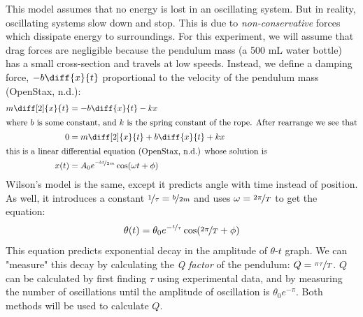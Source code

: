 \documentclass[notitlepage,twocolumn, 12pt]{report}
\begin{document}
    This model assumes that no energy is lost in an oscillating system. But in reality, oscillating systems slow down and stop. This is due to \textit{non-conservative} forces which dissipate energy to surroundings. For this experiment, we will assume that drag forces are negligible because the pendulum mass (a 500 mL water bottle) has a small cross-section and travels at low speeds. Instead, we define a damping force, $-b \diff{x}{t}$ proportional to the velocity of the pendulum mass (OpenStax, n.d.):
    \begin{align*}
        m \diff[2]{x}{t} &= - b \diff{x}{t} - kx \\
        \intertext{where $b$ is some constant, and $k$ is the spring constant of the rope. After rearrange we see that}
        0 &= m \diff[2]{x}{t} + b \diff{x}{t} + kx   \\
    \intertext{this is a linear differential equation (OpenStax, n.d.) whose solution is} 
        x(t) &= A_0e^{\nicefrac{-bt}{2m}}\cos(\omega t + \phi)
    \end{align*} 
    Wilson's model is the same, except it predicts angle with time instead of position. As well, it introduces a constant $\nicefrac{1}{\tau} = \nicefrac{b}{2m}$ and uses $\omega = \nicefrac{2 \pi}{T}$ to get the equation:
    \begin{equation}\label{eq:1}
        \theta(t) = \theta_0 e^{-\nicefrac{t}{\tau}}\cos(\nicefrac{2\pi}{T} + \phi)
    \end{equation}
    This equation predicts exponential decay in the amplitude of $\theta$-$t$ graph. We can "measure" this decay by calculating the \textit{Q factor} of the pendulum: $Q = \nicefrac{\pi \tau}{T}$. $Q$ can be calculated by first finding $\tau$ using experimental data, and by measuring the number of oscillations until the amplitude of oscillation is $\theta_0e^{-\pi}$. Both methods will be used to calculate $Q$. 
    
\end{document}
